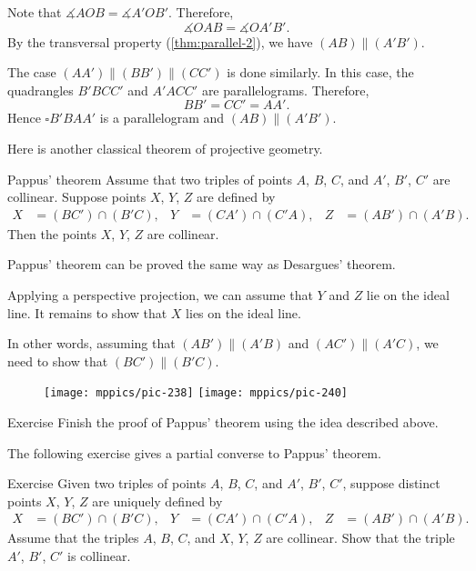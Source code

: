 Note that $\measuredangle AOB=\measuredangle A'OB'$.
Therefore, 
\[\measuredangle OAB=\measuredangle OA'B'.\]
By the transversal property (\ref{thm:parallel-2}), we have
$(AB)\parallel (A'B')$.

The case $(AA')\parallel(BB')\parallel(CC')$ is done similarly.
In this case, the quadrangles $B'BCC'$ and $A'ACC'$ are parallelograms.
Therefore, 
\[BB'=CC'=AA'.\]
Hence $\square B'BAA'$ is a parallelogram and $(AB)\parallel (A'B')$.
\qeds

Here is another classical theorem of projective geometry.

\begin{thm}{Pappus' theorem}\label{thm:pappus}
Assume that two triples of points $A$, $B$, $C$,
and $A'$, $B'$, $C'$ are collinear.
Suppose points $X$, $Y$, $Z$ are defined by
\begin{align*}
X&=(BC')\cap(B'C),
&
Y&=(CA')\cap(C'A),
&
Z&=(AB')\cap(A'B).
\end{align*}
Then the points $X$, $Y$, $Z$ are collinear.
\end{thm}

Pappus' theorem can be proved the same way as Desargues' theorem.

Applying a perspective projection, we can assume that $Y$ and $Z$ lie on the ideal line.
It remains to show that $X$ lies on the ideal line.

In other words, assuming that $(AB')\parallel (A'B)$ and $(AC')\parallel (A'C)$, we need to show that $(BC')\parallel(B'C)$.

\begin{figure}[!ht]
\centering
\texttt{[image: mppics/pic-238]}
\hskip15mm
\texttt{[image: mppics/pic-240]}
\end{figure}


\begin{thm}{Exercise}\label{ex:pappus}
Finish the proof of Pappus' theorem using the idea described above.
\end{thm}

The following exercise gives a partial converse to Pappus' theorem.

\begin{thm}{Exercise}\label{ex:pappus-converse}
Given two triples of points $A$, $B$, $C$,
and $A'$, $B'$, $C'$,
suppose distinct points $X$, $Y$, $Z$ are uniquely defined by
\begin{align*}
X&=(BC')\cap(B'C),
&
Y&=(CA')\cap(C'A),
&
Z&=(AB')\cap(A'B).
\end{align*}
Assume that the triples $A$, $B$, $C$,
and $X$, $Y$, $Z$ are collinear.
Show that the triple $A'$, $B'$, $C'$ is collinear.
\end{thm}

